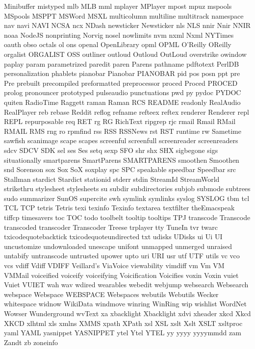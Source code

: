 Minibuffer
mistyped
mlb
MLB
mml
mplayer
MPlayer
mpost
mpuz
mspools
MSpools
MSPPT
MSWord
MSXL
multicolumn
multiline
multitrack
namespace
nav
navi
NAVI
NCSA
ncx
NDash
newsticker
Newsticker
nls
NLS
nnir
Nnir
NNIR
noaa
NodeJS
nonprinting
Norvig
nosel
nowlimits
nvm
nxml
Nxml
NYTimes
oauth
obso
octals
ol
ons
openal
OpenLibrary
opml
OPML
O'Reilly
OReilly
orgalist
ORGALIST
OSS
outliner
outloud
Outloud
OutLoud
overstrike
owindow
paplay
param
parametrized
paredit
paren
Parens
pathname
pdftotext
PerlDB
personalization
phablets
pianobar
Pianobar
PIANOBAR
pid
pos
posn
ppt
pre
Pre
prebuilt
precompiled
preformatted
preprocessor
proced
Proced
PROCED
prolog
pronouncer
prototyped
pulseaudio
punctuations
pwd
py
pydoc
PYDOC
quiten
RadioTime
Raggett
raman
Raman
RCS
README
readonly
RealAudio
RealPlayer
reb
rebase
Reddit
reflog
refname
refteex
reftex
renderer
Renderer
repl
REPL
repurposable
req
RET
rg
RG
RichText
ripgrep
rjc
rmail
Rmail
RMail
RMAIL
RMS
rng
ro
rpmfind
rss
RSS
RSSNews
rst
RST
runtime
rw
Sametime
sawfish
scanimage
scape
scapes
screenful
screenfull
screenreader
screenreaders
sdcv
SDCV
SDK
sel
ses
Ses
setq
sexp
SFO
shr
shx
SHX
sigbegone
sigs
situationally
smartparens
SmartParens
SMARTPARENS
smoothen
Smoothen
snd
Sorenson
sox
Sox
SoX
soxplay
spc
SPC
speakable
speedbar
Speedbar
src
Stallman
stardict
Stardict
stationid
stderr
stdin
StreamId
StreamWorld
strikethru
stylesheet
stylesheets
su
subdir
subdirectories
subjob
submode
subtrees
sudo
summarizer
SunOS
supercite
swh
symlink
symlinks
syslog
SYSLOG
tbm
tcl
TCL
TCP
tetris
Tetris
texi
texinfo
Texinfo
textarea
textfilter
theEmacspeak
tiffcp
timesavers
toc
TOC
todo
toolbelt
tooltip
tooltips
TPJ
transcode
Transcode
transcoded
transcoder
Transcoder
Treese
trplayer
tty
TuneIn
tvr
twarc
txicodequotebacktick
txicodequoteundirected
txt
udisks
UDisks
ui
Ui
UI
uncustomize
undownloaded
unescape
unifont
unmapped
unmerged
unraised
untabify
untranscode
untrusted
upower
upto
uri
URI
usr
utf
UTF
utils
vc
vco
vcs
vdiff
Vdiff
VDIFF
Veillard's
ViaVoice
viewability
vimdiff
vm
Vm
VM
VMMail
voiceified
voiceify
voiceifying
Voicification
Voicifies
voxin
Voxin
vuiet
Vuiet
VUIET
wah
wav
wdired
wearables
webedit
webjump
websearch
Websearch
webspace
Webspace
WEBSPACE
Webspaces
webutils
Webutils
Wecker
whitespace
widnow
WikiData
windmove
winring
WinRing
wip
wishlist
WordNet
Wowser
Wunderground
wvText
xa
xbacklight
Xbacklight
xdvi
xheader
xkcd
Xkcd
XKCD
xlhtml
xls
xmlns
XMMS
xpath
XPath
xsl
XSL
xslt
Xslt
XSLT
xsltproc
yaml
YAML
yasnippet
YASNIPPET
ytel
Ytel
YTEL
yy
yyyy
yyyymmdd
zam
Zandt
zb
zoneinfo
